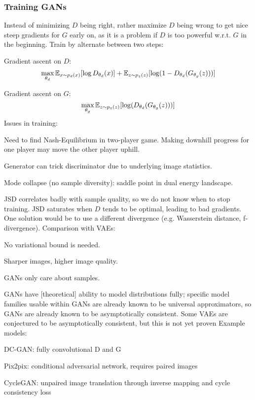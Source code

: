 \documentclass[12pt]{article}
\begin{document}
\subsubsection{Training GANs}
Instead of minimizing $D$ being right, rather maximize $D$ being wrong to get nice steep gradients for $G$ early on, as it is a problem if $D$ is too powerful w.r.t. $G$ in the beginning. Train by alternate between two steps: \\
\olb
\item Gradient ascent on $D$:
\[ \max\limits_{\theta_d} \operatorname{\mathbb{E}}_{x\sim p_d(x)} [\log D_{\theta_d} (x)] + \operatorname{\mathbb{E}}_{z\sim p_z(z)} [\log( 1 - D_{\theta_d}(G_{\theta_g}(z)))] \]
\item Gradient ascent on $G$:
\[ \max\limits_{\theta_g} \operatorname{\mathbb{E}}_{z\sim p_z(z)} [\log(D_{\theta_d}(G_{\theta_g}(z)))] \]
\ole
Issues in training:
\ulb
\item Need to find Nash-Equilibrium in two-player game. Making downhill progress for one player may move the other player uphill.
\item Generator can trick discriminator due to underlying image statistics.
\item Mode collapse (no sample diversity): saddle point in dual energy landscape.
\item JSD correlates badly with sample quality, so we do not know when to stop training. JSD saturates when $D$ tends to be optimal, leading to bad gradients. One solution would be to use a different divergence (e.g. Wasserstein distance, f-divergence).
\ule
Comparison with VAEs:
\ulb
\item No variational bound is needed.
\item Sharper images, higher image quality.
\item GANs only care about samples.
\item GANs have [theoretical] ability to model distributions fully; specific model families usable within GANs are already known to be universal approximators, so GANs are already known to be asymptotically consistent. Some VAEs are conjectured to be asymptotically consistent, but this is not yet proven
\ule
Example models:
\ulb
\item DC-GAN: fully convolutional D and G
\item Pix2pix: conditional adversarial network, requires paired images
\item CycleGAN: unpaired image translation through inverse mapping and cycle consistency loss
\ule
\end{document}
